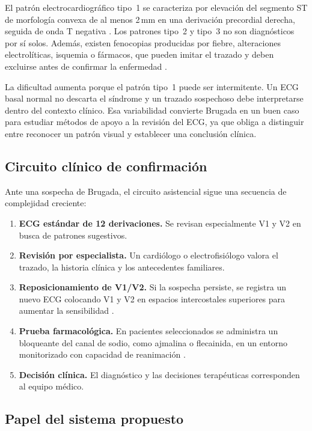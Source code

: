 El patrón electrocardiográfico tipo~1 se caracteriza por elevación del segmento ST de morfología convexa de al menos 2\,mm en una derivación precordial derecha, seguida de onda T negativa \cite{wilde2023scbt}. Los patrones tipo~2 y tipo~3 no son diagnósticos por sí solos. Además, existen fenocopias producidas por fiebre, alteraciones electrolíticas, isquemia o fármacos, que pueden imitar el trazado y deben excluirse antes de confirmar la enfermedad \cite{sieira2017}.

La dificultad aumenta porque el patrón tipo~1 puede ser intermitente. Un ECG basal normal no descarta el síndrome y un trazado sospechoso debe interpretarse dentro del contexto clínico. Esa variabilidad convierte Brugada en un buen caso para estudiar métodos de apoyo a la revisión del ECG, ya que obliga a distinguir entre reconocer un patrón visual y establecer una conclusión clínica.

\subsection{Circuito clínico de confirmación}

Ante una sospecha de Brugada, el circuito asistencial sigue una secuencia de complejidad creciente:

\begin{enumerate}
  \item \textbf{ECG estándar de 12 derivaciones.} Se revisan especialmente V1 y V2 en busca de patrones sugestivos.
  \item \textbf{Revisión por especialista.} Un cardiólogo o electrofisiólogo valora el trazado, la historia clínica y los antecedentes familiares.
  \item \textbf{Reposicionamiento de V1/V2.} Si la sospecha persiste, se registra un nuevo ECG colocando V1 y V2 en espacios intercostales superiores para aumentar la sensibilidad \cite{sieira2017}.
  \item \textbf{Prueba farmacológica.} En pacientes seleccionados se administra un bloqueante del canal de sodio, como ajmalina o flecainida, en un entorno monitorizado con capacidad de reanimación \cite{brugadadrugsdiagnostic}.
  \item \textbf{Decisión clínica.} El diagnóstico y las decisiones terapéuticas corresponden al equipo médico.
\end{enumerate}

\subsection{Papel del sistema propuesto}

